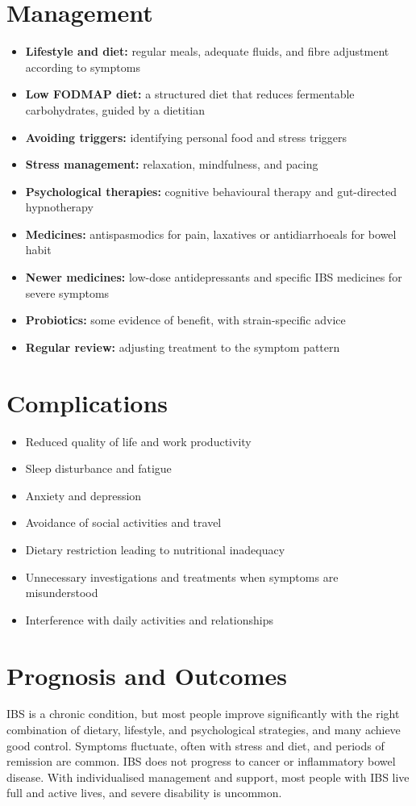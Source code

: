 \section*{Management}
\begin{itemize}
    \item \textbf{Lifestyle and diet:} regular meals, adequate fluids, and fibre adjustment according to symptoms
    \item \textbf{Low FODMAP diet:} a structured diet that reduces fermentable carbohydrates, guided by a dietitian
    \item \textbf{Avoiding triggers:} identifying personal food and stress triggers
    \item \textbf{Stress management:} relaxation, mindfulness, and pacing
    \item \textbf{Psychological therapies:} cognitive behavioural therapy and gut-directed hypnotherapy
    \item \textbf{Medicines:} antispasmodics for pain, laxatives or antidiarrhoeals for bowel habit
    \item \textbf{Newer medicines:} low-dose antidepressants and specific IBS medicines for severe symptoms
    \item \textbf{Probiotics:} some evidence of benefit, with strain-specific advice
    \item \textbf{Regular review:} adjusting treatment to the symptom pattern
\end{itemize}

\section*{Complications}
\begin{itemize}
    \item Reduced quality of life and work productivity
    \item Sleep disturbance and fatigue
    \item Anxiety and depression
    \item Avoidance of social activities and travel
    \item Dietary restriction leading to nutritional inadequacy
    \item Unnecessary investigations and treatments when symptoms are misunderstood
    \item Interference with daily activities and relationships
\end{itemize}

\section*{Prognosis and Outcomes}
IBS is a chronic condition, but most people improve significantly with the right combination of dietary, lifestyle, and psychological strategies, and many achieve good control. Symptoms fluctuate, often with stress and diet, and periods of remission are common. IBS does not progress to cancer or inflammatory bowel disease. With individualised management and support, most people with IBS live full and active lives, and severe disability is uncommon.

